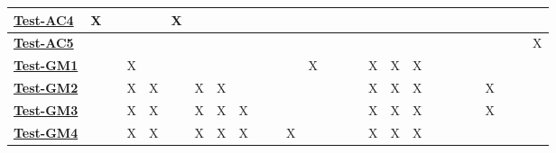 \documentclass[12pt, titlepage]{article}
\begin{document}
\begin{landscape}
\begin{table}[H]
\begin{adjustwidth}{-0.0in}{-1in}
{\begin{tabular}{l|l|l|l|l|l|l|l|l|l|l|l|l|l|l|l|l|l|l|l|l|l|l|l|l|l|l|}
\multicolumn{1}{|l|}{\hyperref[Test-AC4]{\textbf{Test-AC4}}}  & X            &              &              &              & X            &              &              &              &              &               &               &               &               &               &               &               &               &               &               &               &               &               &             &             &             &             \\ \hline
\multicolumn{1}{|l|}{\hyperref[Test-AC5]{\textbf{Test-AC5}}}  &              &              &              &              &              &              &              &              &              &               &               &               &               &               &               &               &               &               &               &               &               &               &             &             &             & X           \\ \hline
\multicolumn{1}{|l|}{\hyperref[Test-GM1]{\textbf{Test-GM1}}}  &              &              & X            &              &              &              &              &              &              &               &               & X             &               &               &               & X             & X             & X             &               &               &               &               &             &             &             &             \\ \hline
\multicolumn{1}{|l|}{\hyperref[Test-GM2]{\textbf{Test-GM2}}}  &              &              & X            & X            &              & X            & X            &              &              &               &               &               &               &               &               & X             & X             & X             &               &               &               &               & X           &             &             &             \\ \hline
\multicolumn{1}{|l|}{\hyperref[Test-GM3]{\textbf{Test-GM3}}}  &              &              & X            & X            &              & X            & X            & X            &              &               &               &               &               &               &               & X             & X             & X             &               &               &               &               & X           &             &             &             \\ \hline
\multicolumn{1}{|l|}{\hyperref[Test-GM4]{\textbf{Test-GM4}}}  &              &              & X            & X            &              & X            & X            & X            &              &               & X             &               &               &               &               & X             & X             & X             &               &               &               &               &             &             &             &             \\ \hline

\end{tabular}}
\end{adjustwidth}
\end{table}
\end{landscape}
\end{document}
